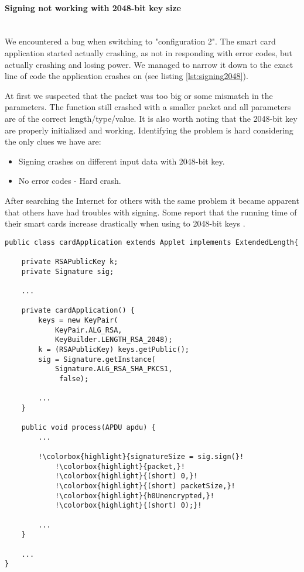 \paragraph{Signing not working with 2048-bit key size}\mbox{}\\
We encountered a bug when switching to "configuration 2". The smart card application started actually crashing, as not in responding with error codes, but actually crashing and losing power. We managed to narrow it down to the exact line of code the application crashes on (see listing \ref{lst:signing2048}).

At first we suspected that the packet was too big or some mismatch in the parameters. The function still crashed with a smaller packet and all parameters are of the correct length/type/value. It is also worth noting that the 2048-bit key are properly initialized and working. Identifying the problem is hard considering the only clues we have are:

\begin{itemize}
    \item Signing crashes on different input data with 2048-bit key.
    \item No error codes - Hard crash.
\end{itemize}

After searching the Internet for others with the same problem it became apparent that others have had troubles with signing. Some report that the running time of their smart cards increase drastically when using to 2048-bit keys \cite{signingtrouble2}. %

\begin{lstlisting}[caption=Java Card failed signing., label=lst:signing2048, escapechar=!]
public class cardApplication extends Applet implements ExtendedLength{

    private RSAPublicKey k;
    private Signature sig;

    ...

    private cardApplication() {
        keys = new KeyPair(
            KeyPair.ALG_RSA,
            KeyBuilder.LENGTH_RSA_2048);
        k = (RSAPublicKey) keys.getPublic();
    	sig = Signature.getInstance(
            Signature.ALG_RSA_SHA_PKCS1,
             false);

        ...
    }

    public void process(APDU apdu) {
    	...

        !\colorbox{highlight}{signatureSize = sig.sign(}!
            !\colorbox{highlight}{packet,}!
            !\colorbox{highlight}{(short) 0,}!
            !\colorbox{highlight}{(short) packetSize,}!
            !\colorbox{highlight}{h0Unencrypted,}!
            !\colorbox{highlight}{(short) 0);}!

        ...
    }

    ...
}
\end{lstlisting}


